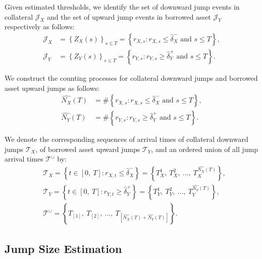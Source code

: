 \documentclass{article}
\theoremstyle{definition}
\begin{document}
Given estimated thresholds, we identify the set of downward jump events in collateral $\mathcal{J}_X$ and the set of upward jump events in borrowed asset $\mathcal{J}_Y$ respectively as follows:
\begin{equation}
   \begin{split}
   \mathcal{J}_X &= \left\{Z_X(s)\right\}_{s \leq T} = \left\{
     r_{X,s}: r_{X,s} \leq \widehat\delta_X^- \text{ and } s \leq T
     \right\},\\
     \mathcal{J}_Y &= \left\{Z_Y(s)\right\}_{s \leq T} = \left\{
       r_{Y,s}: r_{Y,s} \geq \widehat\delta_Y^+ \text{ and } s \leq T
       \right\}.
   \end{split}
\end{equation}

We construct the counting processes for collateral downward jumps and borrowed asset upward jumps as follows:
\begin{equation}
   \begin{split}
   \widehat{N_X}(T) &= \#\left\{
       r_{X,s}: r_{X,s} \leq \widehat\delta_X^- \text{ and } s \leq T
       \right\}, \\ 
   \widehat{N_Y}(T) &= \#\left\{
       r_{Y,s}: r_{Y,s} \geq \widehat\delta_Y^+ \text{ and } s \leq T
       \right\}.
   \end{split}
\end{equation}

We denote the corresponding sequences of arrival times of collateral downward jumps $\mathcal{T}_X$, of borrowed asset upward jumps $\mathcal{T}_Y$, and an ordered union of all jump arrival times $\mathcal{T}^{\cup}$ by:
\begin{equation}
   \begin{split}
& \mathcal{T}_X = \left\{t \in [0,\ T]: r_{X,t} \leq \widehat\delta_X^- \right\} = \left\{T_X^1,\ T_X^2,\ ...,\ T_X^{\widehat{N_X}(T)}\right\},\\
& \mathcal{T}_Y = \left\{t \in [0,\ T]: r_{Y,t} \geq \widehat\delta_Y^+ \right\} = \left\{T_Y^1,\ T_Y^2,\ ...,\ T_Y^{\widehat{N_Y}(T)}\right\},\\
& \mathcal{T}^{\cup} = \left\{T_{[1]},\ T_{[2]},\ ...,\ T_{[\widehat{N_X}(T)+\widehat{N_Y}(T)]}\right\}.
   \end{split}
\end{equation}

\subsection{Jump Size Estimation}
\end{document}
